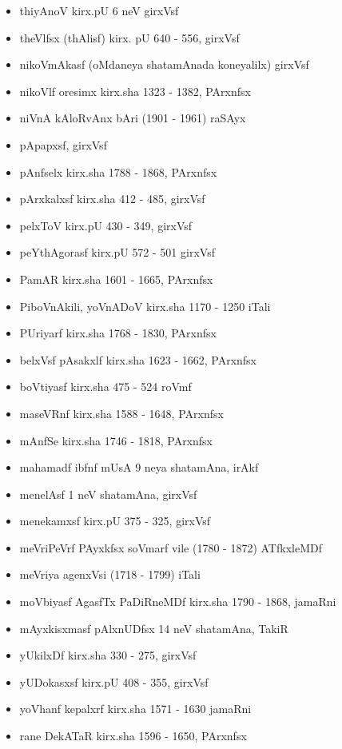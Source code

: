 {\begin{itemize}
\item thiyAnoV kirx.pU {\rm 6} neV girxVsf
\item theVlfsx (thAlisf) kirx. pU {\rm 640 - 556}, girxVsf
\item nikoVmAkasf (oMdaneya shatamAnada koneyalilx) girxVsf
\item nikoVlf oresimx kirx.sha {\rm 1323 - 1382}, PArxnfsx
\item niVnA kAloRvAnx bAri {\rm (1901 - 1961)} raSAyx
\item pApapxsf, girxVsf
\item pAnfselx kirx.sha {\rm 1788 - 1868}, PArxnfsx
\item pArxkalxsf kirx.sha {\rm 412 - 485}, girxVsf
\item pelxToV kirx.pU {\rm 430 - 349}, girxVsf
\item peYthAgorasf kirx.pU {\rm 572 - 501} girxVsf
\item PamAR kirx.sha {\rm 1601 - 1665}, PArxnfsx
\item PiboVnAkili, yoVnADoV kirx.sha {\rm 1170 - 1250} iTali
\item PUriyarf kirx.sha {\rm 1768 - 1830}, PArxnfsx
\item belxVsf pAsakxlf kirx.sha {\rm 1623 - 1662}, PArxnfsx
\item boVtiyasf kirx.sha {\rm 475 - 524} roVmf
\item maseVRnf kirx.sha {\rm 1588 - 1648}, PArxnfsx
\item mAnfSe kirx.sha {\rm 1746 - 1818}, PArxnfsx
\item mahamadf ibfnf mUsA {\rm 9} neya shatamAna, irAkf
\item menelAsf {\rm 1} neV shatamAna, girxVsf
\item menekamxsf kirx.pU {\rm 375 - 325}, girxVsf 
\item meVriPeVrf PAyxkfsx soVmarf vile {\rm (1780 - 1872)} ATfkxleMDf
\item meVriya agenxVsi {\rm (1718 - 1799)} iTali
\item moVbiyasf AgasfTx PaDiRneMDf kirx.sha {\rm 1790 - 1868}, jamaRni
\item mAyxkisxmasf pAlxnUDfsx {\rm 14} neV shatamAna, TakiR
\item yUkilxDf kirx.sha {\rm 330 - 275}, girxVsf
\item yUDokasxsf kirx.pU {\rm 408 - 355}, girxVsf
\item yoVhanf kepalxrf kirx.sha {\rm 1571 - 1630} jamaRni
\item rane DekATaR kirx.sha {\rm 1596 - 1650}, PArxnfsx

\end{itemize}}

